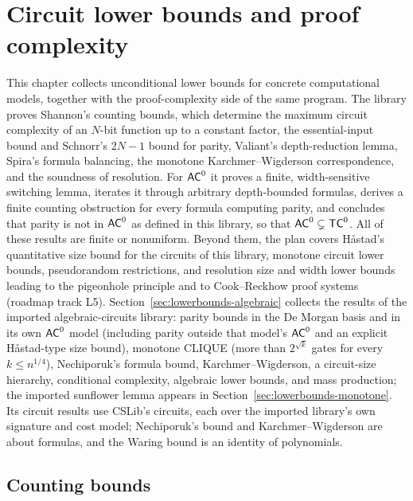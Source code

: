 \chapter{Circuit lower bounds and proof complexity}
\label{chap:lowerbounds}

This chapter collects unconditional lower bounds for concrete computational
models, together with the proof-complexity side of the same program. The
library proves Shannon's counting bounds, which determine the maximum circuit
complexity of an $N$-bit function up to a constant factor, the essential-input
bound and Schnorr's $2N - 1$ bound for parity, Valiant's depth-reduction lemma,
Spira's formula balancing, the monotone Karchmer--Wigderson correspondence, and
the soundness of resolution. For $\mathsf{AC}^0$ it proves a finite, width-sensitive
switching lemma, iterates it through arbitrary depth-bounded formulas, derives a
finite counting obstruction for every formula computing parity, and concludes
that parity is not in $\mathsf{AC}^0$ as defined in this library, so that
$\mathsf{AC}^0 \subsetneq \mathsf{TC}^0$. All of these results are finite or
nonuniform. Beyond them, the plan covers Håstad's quantitative size bound for
the circuits of this library, monotone circuit lower bounds, pseudorandom
restrictions, and resolution size and width lower bounds leading to the
pigeonhole principle and to Cook--Reckhow proof systems (roadmap track L5).
Section~\ref{sec:lowerbounds-algebraic} collects the results of the imported
algebraic-circuits library: parity bounds in the De Morgan basis and in its own
$\mathsf{AC}^0$ model (including parity outside that model's $\mathsf{AC}^0$ and an
explicit Håstad-type size bound), monotone CLIQUE (more than $2^{\sqrt{k}}$
gates for every $k \le n^{1/4}$),
Nechiporuk's formula bound, Karchmer--Wigderson, a circuit-size hierarchy,
conditional complexity, algebraic lower bounds, and mass production; the
imported sunflower lemma appears in Section~\ref{sec:lowerbounds-monotone}. Its
circuit results use CSLib's circuits, each over the imported library's own
signature and cost model; Nechiporuk's bound and Karchmer--Wigderson are about
formulas, and the Waring bound is an identity of polynomials.

\section{Counting bounds}
\label{sec:lowerbounds-counting}

